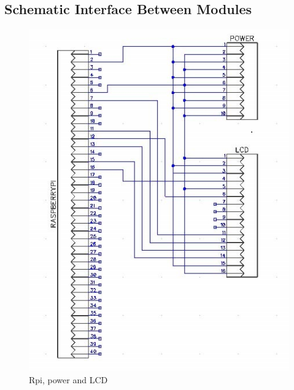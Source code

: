 \documentclass[a4paper,12pt,oneside]{book}
\begin{document}
\subsection{Schematic Interface Between Modules}
\begin{figure}[!htb]
\includegraphics[width=\linewidth]{connection1.jpg}
\caption{Rpi, power and LCD}
\endminipage\hfill
{}

\end{figure}
\end{document}
